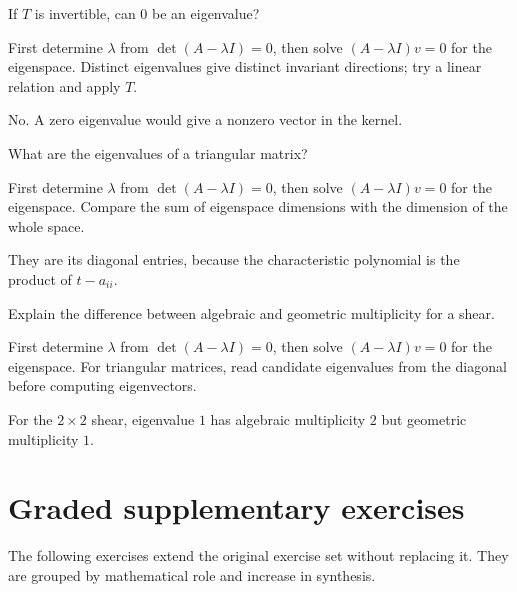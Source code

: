 \begin{exercise}\label{exr:i09-06}
If $T$ is invertible, can $0$ be an eigenvalue?
\end{exercise}
\begin{hint}
First determine \(\lambda\) from \(\det(A-\lambda I)=0\), then solve \((A-\lambda I)v=0\) for the eigenspace. Distinct eigenvalues give distinct invariant directions; try a linear relation and apply \(T\).
\end{hint}
\begin{solution}
No. A zero eigenvalue would give a nonzero vector in the kernel.
\end{solution}

\begin{exercise}\label{exr:i09-07}
What are the eigenvalues of a triangular matrix?
\end{exercise}
\begin{hint}
First determine \(\lambda\) from \(\det(A-\lambda I)=0\), then solve \((A-\lambda I)v=0\) for the eigenspace. Compare the sum of eigenspace dimensions with the dimension of the whole space.
\end{hint}
\begin{solution}
They are its diagonal entries, because the characteristic polynomial is the product of $t-a_{ii}$.
\end{solution}

\begin{exercise}\label{exr:i09-08}
Explain the difference between algebraic and geometric multiplicity for a shear.
\end{exercise}
\begin{hint}
First determine \(\lambda\) from \(\det(A-\lambda I)=0\), then solve \((A-\lambda I)v=0\) for the eigenspace. For triangular matrices, read candidate eigenvalues from the diagonal before computing eigenvectors.
\end{hint}
\begin{solution}
For the $2\times2$ shear, eigenvalue $1$ has algebraic multiplicity $2$ but geometric multiplicity $1$.
\end{solution}


\section{Graded supplementary exercises}
The following exercises extend the original exercise set without replacing it. They are grouped by mathematical role and increase in synthesis.

